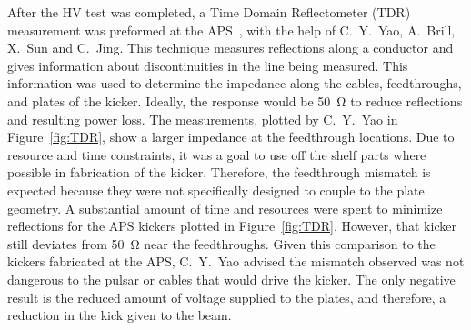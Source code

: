 After the HV test was completed, a Time Domain Reflectometer (TDR) measurement was preformed at the APS~\cite{TDR}, 
with the help of C.~Y.~Yao, A.~Brill, X.~Sun and C.~Jing.
This technique measures reflections along a conductor and gives information about discontinuities in the line being measured. 
This information was used to determine the impedance along the cables, feedthroughs, and plates of the kicker. 
Ideally, the response would be \SI{50}{\ohm} to reduce reflections and resulting power loss. 
The measurements, plotted by C.~Y.~Yao in Figure~\ref{fig:TDR}, show a larger impedance at the feedthrough locations.
Due to resource and time constraints, it was a goal to use off the shelf parts where possible in fabrication of the kicker.
Therefore, the feedthrough mismatch is expected because they were not specifically designed to couple to the plate geometry.
A substantial amount of time and resources were spent to minimize reflections for the APS kickers plotted in Figure~\ref{fig:TDR}.
However, that kicker still deviates from \SI{50}{\ohm} near the feedthroughs.
Given this comparison to the kickers fabricated at the APS, C.~Y.~Yao advised the mismatch observed was not dangerous to 
the pulsar or cables that would drive the kicker.  
The only negative result is the reduced amount of voltage supplied to the plates, and therefore, a reduction in the kick given to the beam.
